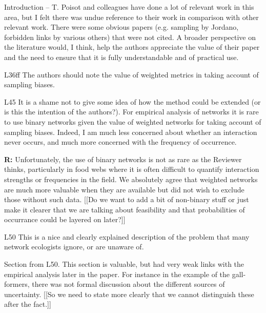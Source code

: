 \documentclass[12pt]{letter}
\begin{document}
Introduction – T. Poisot and colleagues have done a lot of relevant work in this area, but I felt there was undue reference to their work in comparison with other relevant work. There were some obvious papers (e.g. sampling by Jordano, forbidden links by various others) that were not cited. A broader perspective on the literature would, I think, help the authors appreciate the value of their paper and the need to ensure that it is fully understandable and of practical use.

L36ff The authors should note the value of weighted metrics in taking account of sampling biases.

L45 It is a shame not to give some idea of how the method could be extended (or is this the intention of the authors?). For empirical analysis of networks it is rare to use binary networks given the value of weighted networks for taking account of sampling biases. Indeed, I am much less concerned about whether an interaction never occurs, and much more concerned with the frequency of occurrence.

\textbf{R:} Unfortunately, the use of binary networks is not as rare as the Reviewer thinks, particularly in food webs where it is often difficult to quantify interaction strengths or frequencies in the field. We absolutely agree that weighted networks are much more valuable when they are available but did not wish to exclude those without such data. [[Do we want to add a bit of non-binary stuff or just make it clearer that we are talking about feasibility and that probabilities of occurrance could be layered on later?]]


L50 This is a nice and clearly explained description of the problem that many network ecologists ignore, or are unaware of.

Section from L50. This section is valuable, but had very weak links with the empirical analysis later in the paper. For instance in the example of the gall-formers, there was not formal discussion about the different sources of uncertainty. [[So we need to state more clearly that we cannot distinguish these after the fact.]]
\end{document}
